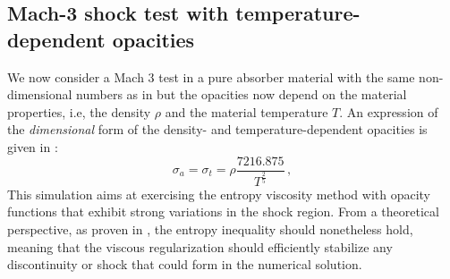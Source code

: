 \documentclass[times,doublespace]{fldauth}%
\begin{document}
\subsection{Mach-3 shock test with temperature-dependent opacities}\label{sec:mach-3-no-cst-xs}
%
We now consider a Mach 3 test in a pure absorber material with the same non-dimensional numbers as in  but the opacities now depend on the material properties, i.e, the density $\rho$ and the material temperature $T$. An expression of the \emph{dimensional} form of the density- and  temperature-dependent opacities is given in :
%
\begin{equation}\label{eq:opacity}
\sigma_a = \sigma_t = \rho \frac{7216.875}{T^{\frac{2}{5}}}\, ,
\end{equation}
%
This simulation aims at exercising the entropy viscosity method with opacity functions that exhibit strong variations in the shock region. From a theoretical perspective, as proven in , the entropy inequality should nonetheless hold, meaning that the viscous regularization should efficiently stabilize any discontinuity or shock that could form in the numerical solution. 
\end{document}
